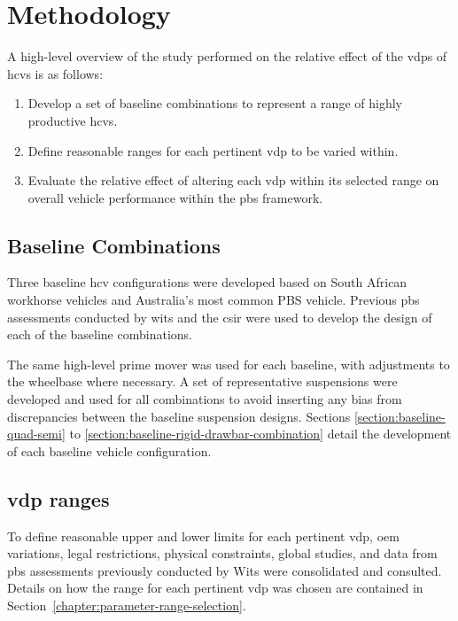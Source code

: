 \chapter{Methodology}\label{chapter:methodology}
A high-level overview of the study performed on the relative effect of the \glspl{vdp} of \glspl{hcv} is as follows:

\begin{enumerate}\addtolength{\itemsep}{0.5\baselineskip}
\item Develop a set of baseline combinations to represent a range of highly productive \glspl{hcv}.
\item Define reasonable ranges for each pertinent \gls{vdp} to be varied within.
\item Evaluate the relative effect of altering each \gls{vdp} within its selected range on overall vehicle performance within the \gls{pbs} framework.
\end{enumerate}

\section{Baseline Combinations\label{section:methodbaselinecombinations}}
Three baseline \gls{hcv} configurations were developed based on South African workhorse vehicles and Australia's most common PBS vehicle.  Previous \gls{pbs} assessments conducted by \gls{wits} and the \gls{csir} were used to develop the design of each of the baseline combinations.

The same high-level prime mover was used for each baseline, with adjustments to the wheelbase where necessary. A set of representative suspensions were developed and used for all combinations to avoid inserting any bias from discrepancies between the baseline suspension designs. Sections \ref{section:baseline-quad-semi} to \ref{section:baseline-rigid-drawbar-combination} detail the development of each baseline vehicle configuration.

\section{\gls{vdp} ranges\label{section:methodvdpranges}}
To define reasonable upper and lower limits for each pertinent \gls{vdp}, \gls{oem} variations, legal restrictions, physical constraints, global studies, and data from \gls{pbs} assessments previously conducted by Wits were consolidated and consulted. Details on how the range for each pertinent \gls{vdp} was chosen are contained in Section~\ref{chapter:parameter-range-selection}.

